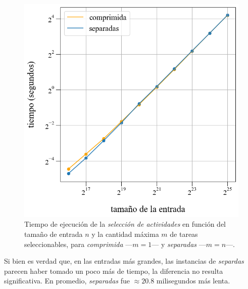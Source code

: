 \begin{figure}[!htbp]
    \includegraphics[scale=0.5, clip]{./files/src/.media/comparacion.png}
    \caption{Tiempo de ejecución de la \textit{selección de actividades} en función del tamaño de entrada $n$ y la cantidad máxima $m$ de tareas seleccionables, para \textit{comprimida} ---$m = 1$--- y \textit{separadas} ---$m = n$---.} \label{comparacion}
\end{figure}


Si bien es verdad que, en las entradas más grandes, las instancias de \textit{separdas} parecen haber tomado un poco más de tiempo, la diferencia no resulta significativa. En promedio, \textit{separadas} fue $\approx 20.8$ milisegundos más lenta.